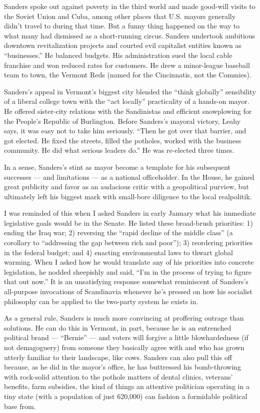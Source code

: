 Sanders spoke out against poverty in the third world and made good-will
visits to the Soviet Union and Cuba, among other places that U.S. mayors
generally didn't travel to during that time. But a funny thing happened
on the way to what many had dismissed as a short-running circus. Sanders
undertook ambitious downtown revitalization projects and courted evil
capitalist entities known as ``businesses.'' He balanced budgets. His
administration sued the local cable franchise and won reduced rates for
customers. He drew a minor-league baseball team to town, the Vermont
Reds (named for the Cincinnatis, not the Commies).

Sanders's appeal in Vermont's biggest city blended the ``think
globally'' sensibility of a liberal college town with the ``act
locally'' practicality of a hands-on mayor. He offered sister-city
relations with the Sandinistas and efficient snowplowing for the
People's Republic of Burlington. Before Sanders's mayoral victory, Leahy
says, it was easy not to take him seriously. ``Then he got over that
barrier, and got elected. He fixed the streets, filled the potholes,
worked with the business community. He did what serious leaders do.'' He
was re-elected three times.

In a sense, Sanders's stint as mayor become a template for his
subsequent successes --- and limitations --- as a national officeholder.
In the House, he gained great publicity and favor as an audacious critic
with a geopolitical purview, but ultimately left his biggest mark with
small-bore diligence to the local realpolitik.

I was reminded of this when I asked Sanders in early January what his
immediate legislative goals would be in the Senate. He listed these
broad-brush priorities: 1) ending the Iraq war; 2) reversing the ``rapid
decline of the middle class'' (a corollary to ``addressing the gap
between rich and poor''); 3) reordering priorities in the federal
budget; and 4) enacting environmental laws to thwart global warming.
When I asked how he would translate any of his priorities into concrete
legislation, he nodded sheepishly and said, ``I'm in the process of
trying to figure that out now.'' It is an unsatisfying response somewhat
reminiscent of Sanders's all-purpose invocations of Scandinavia whenever
he's pressed on how his socialist philosophy can be applied to the
two-party system he exists in.

As a general rule, Sanders is much more convincing at proffering outrage
than solutions. He can do this in Vermont, in part, because he is an
entrenched political brand --- ``Bernie'' --- and voters will forgive a
little blowhardedness (if not demagoguery) from someone they basically
agree with and who has grown utterly familiar to their landscape, like
cows. Sanders can also pull this off because, as he did in the mayor's
office, he has buttressed his bomb-throwing with rock-solid attention to
the pothole matters of dental clinics, veterans' benefits, farm
subsidies, the kind of things an attentive politician operating in a
tiny state (with a population of just 620,000) can fashion a formidable
political base from.

